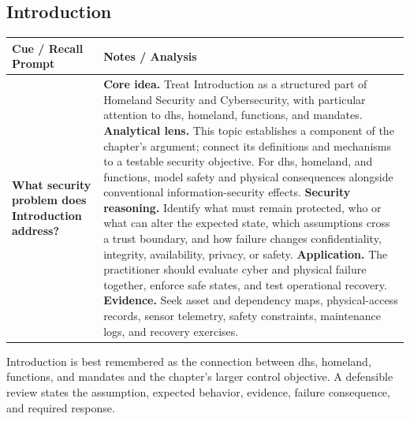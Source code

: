 \documentclass[11pt]{article}
\newcommand{\CornellHeader}{%
\rowcolor{Navy}\color{white}\bfseries Cue / Recall Prompt & \color{white}\bfseries Notes / Analysis\\\hline}
\newcommand{\CornellRow}[2]{%
\cellcolor{CueGray}\RaggedRight\textbf{#1} & \RaggedRight #2\\\hline}
\begin{document}
\subsection*{Introduction}
\begin{longtable}{>{\RaggedRight\arraybackslash}p{}|>{\RaggedRight\arraybackslash}p{}}
\CornellHeader
\CornellRow{What security problem does Introduction address?}{\textbf{Core idea.} Treat Introduction as a structured part of Homeland Security and Cybersecurity, with particular attention to dhs, homeland, functions, and mandates. \textbf{Analytical lens.} This topic establishes a component of the chapter's argument; connect its definitions and mechanisms to a testable security objective. For dhs, homeland, and functions, model safety and physical consequences alongside conventional information-security effects. \textbf{Security reasoning.} Identify what must remain protected, who or what can alter the expected state, which assumptions cross a trust boundary, and how failure changes confidentiality, integrity, availability, privacy, or safety. \textbf{Application.} The practitioner should evaluate cyber and physical failure together, enforce safe states, and test operational recovery. \textbf{Evidence.} Seek asset and dependency maps, physical-access records, sensor telemetry, safety constraints, maintenance logs, and recovery exercises.}
\end{longtable}
\begin{topicsummary}
Introduction is best remembered as the connection between dhs, homeland, functions, and mandates and the chapter's larger control objective. A defensible review states the assumption, expected behavior, evidence, failure consequence, and required response.
\end{topicsummary}
\end{document}

